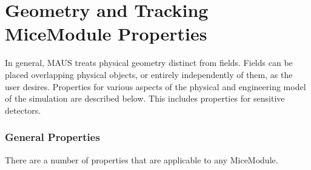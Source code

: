 \chapter{Geometry and Tracking MiceModule Properties}
In general, MAUS treats physical geometry distinct from fields. Fields can be placed overlapping physical
objects, or entirely independently of them, as the user desires. Properties for various aspects of the
physical and engineering model of the simulation are described below. This includes properties for
sensitive detectors.

\subsection{General Properties}
There are a number of properties that are applicable to any MiceModule.

